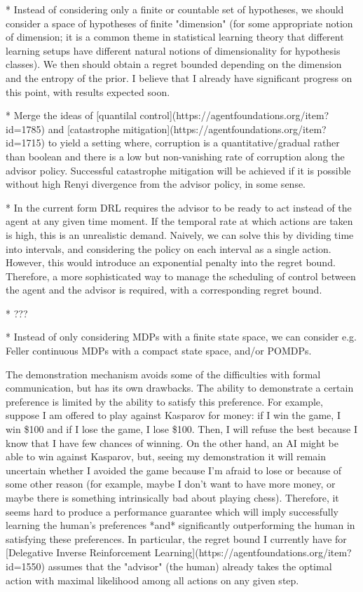 \documentclass[a4paper]{article}
\begin{document}
* Instead of considering only a finite or countable set of hypotheses, we should consider a space of hypotheses of finite "dimension" (for some appropriate notion of dimension; it is a common theme in statistical learning theory that different learning setups have different natural notions of dimensionality for hypothesis classes). We then should obtain a regret bounded depending on the dimension and the entropy of the prior. I believe that I already have significant progress on this point, with results expected soon.

* Merge the ideas of [quantilal control](https://agentfoundations.org/item?id=1785) and [catastrophe mitigation](https://agentfoundations.org/item?id=1715) to yield a setting where, corruption is a quantitative/gradual rather than boolean and there is a low but non-vanishing rate of corruption along the advisor policy. Successful catastrophe mitigation will be achieved if it is possible without high Renyi divergence from the advisor policy, in some sense.

* In the current form DRL requires the advisor to be ready to act instead of the agent at any given time moment. If the temporal rate at which actions are taken is high, this is an unrealistic demand. Naively, we can solve this by dividing time into intervals, and considering the policy on each interval as a single action. However, this would introduce an exponential penalty into the regret bound. Therefore, a more sophisticated way to manage the scheduling of control between the agent and the advisor is required, with a corresponding regret bound.

* ??? %

* Instead of only considering MDPs with a finite state space, we can consider e.g. Feller continuous MDPs with a compact state space, and/or POMDPs.

The demonstration mechanism avoids some of the difficulties with formal communication, but has its own drawbacks. The ability to demonstrate a certain preference is limited by the ability to satisfy this preference. For example, suppose I am offered to play against Kasparov for money: if I win the game, I win \$100 and if I lose the game, I lose \$100. Then, I will refuse the best because I know that I have few chances of winning. On the other hand, an AI might be able to win against Kasparov, but, seeing my demonstration it will remain uncertain whether I avoided the game because I'm afraid to lose or because of some other reason (for example, maybe I don't want to have more money, or maybe there is something intrinsically bad about playing chess). Therefore, it seems hard to produce a performance guarantee which will imply successfully learning the human's preferences *and* significantly outperforming the human in satisfying these preferences. In particular, the regret bound I currently have for [Delegative Inverse Reinforcement Learning](https://agentfoundations.org/item?id=1550) assumes that the "advisor" (the human) already takes the optimal action with maximal likelihood among all actions on any given step.
\end{document}
